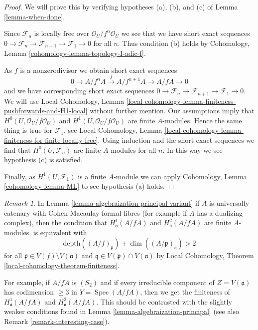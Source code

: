 \documentclass{stacks-project}
\theoremstyle{plain}
\theoremstyle{definition}
\theoremstyle{remark}
\newtheorem{remark}[subsection]{Remark}
\numberwithin{equation}{subsection}
\def\Spec{\mathop{\mathrm{Spec}}}
\begin{document}
\begin{proof}
We will prove this by verifying hypotheses (a), (b), and (c) of
Lemma \ref{lemma-when-done}.

\medskip\noindent
Since $\mathcal{F}_n$ is locally free over $\mathcal{O}_U/f^n\mathcal{O}_U$
we see that we have short exact sequences
$0 \to \mathcal{F}_n \to \mathcal{F}_{n + 1} \to \mathcal{F}_1 \to 0$
for all $n$. Thus condition (b) holds by
Cohomology, Lemma \ref{cohomology-lemma-topology-I-adic-f}.

\medskip\noindent
As $f$ is a nonzerodivisor we obtain short exact sequences
$$
0 \to A/f^nA \xrightarrow{f} A/f^{n + 1}A \to A/fA \to 0
$$
and we have corresponding short exact sequences
$0 \to \mathcal{F}_n \to \mathcal{F}_{n + 1} \to \mathcal{F}_1 \to 0$.
We will use
Local Cohomology, Lemma
\ref{local-cohomology-lemma-finiteness-pushforwards-and-H1-local}
without further mention. Our assumptions imply that
$H^0(U, \mathcal{O}_U/f\mathcal{O}_U)$ and
$H^1(U, \mathcal{O}_U/f\mathcal{O}_U)$
are finite $A$-modules. Hence the same thing is true for $\mathcal{F}_1$, see
Local Cohomology, Lemma
\ref{local-cohomology-lemma-finiteness-for-finite-locally-free}.
Using induction and the short exact sequences we find that
$H^0(U, \mathcal{F}_n)$ are finite $A$-modules for all $n$.
In this way we see hypothesis (c) is satisfied.

\medskip\noindent
Finally, as $H^1(U, \mathcal{F}_1)$ is a finite $A$-module
we can apply Cohomology, Lemma \ref{cohomology-lemma-ML}
to see hypothesis (a) holds.
\end{proof}

\begin{remark}
\label{remark-interesting-case-variant}
In Lemma \ref{lemma-algebraization-principal-variant}
if $A$ is universally catenary with Cohen-Macaulay
formal fibres (for example if $A$ has a dualizing complex), then
the condition that
$H^1_\mathfrak a(A/fA)$ and $H^2_\mathfrak a(A/fA)$
are finite $A$-modules, is equivalent with
$$
\text{depth}((A/f)_\mathfrak p) + \dim((A/\mathfrak p)_\mathfrak q) > 2
$$
for all $\mathfrak p \in V(f) \setminus V(\mathfrak a)$
and $\mathfrak q \in V(\mathfrak p) \cap V(\mathfrak a)$
by Local Cohomology, Theorem \ref{local-cohomology-theorem-finiteness}.

\medskip\noindent
For example, if $A/fA$ is $(S_2)$ and if every irreducible
component of $Z = V(\mathfrak a)$ has codimension $\geq 3$
in $Y = \Spec(A/fA)$, then we get the finiteness of
$H^1_\mathfrak a(A/fA)$ and $H^2_\mathfrak a(A/fA)$.
This should be contrasted with the slightly weaker conditions
found in Lemma \ref{lemma-algebraization-principal}
(see also Remark \ref{remark-interesting-case}).
\end{remark}
\end{document}
